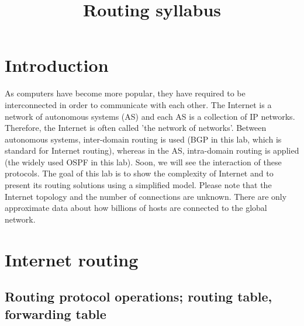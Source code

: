 \documentclass[a4paper]{article}
\title{Routing syllabus}
\author{}
\date{}
\begin{document}
\maketitle

\tableofcontents

\section{Introduction}
As computers have become more popular, they have required to be interconnected in order to communicate with each other.
The Internet is a network of autonomous systems (AS) and each AS is a collection of IP networks. Therefore, the
Internet is often called 'the network of networks'. Between autonomous systems, inter-domain routing is used (BGP in
this lab, which is standard for Internet routing), whereas in the AS, intra-domain routing is applied (the widely used
OSPF in this lab). Soon, we will see the interaction of these protocols. The goal of this lab is to show the complexity
of Internet and to present its routing solutions using a simplified model. Please note that the Internet topology and
the number of connections are unknown. There are only approximate data about how billions of hosts are connected to the
global network.

\section{Internet routing}

\subsection{Routing protocol operations; routing table, forwarding table}
\end{document}
